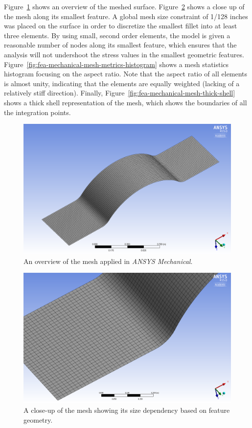 Figure~\ref{fig:fea-mechanical-mesh-surface} shows an overview of the meshed surface. Figure~\ref{fig:fea-mechanical-mesh-closeup} shows a close up of the mesh along its smallest feature. A global mesh size constraint of 1/128 inches was placed on the surface in order to discretize the smallest fillet into at least three elements. By using small, second order elements, the model is given a reasonable number of nodes along its smallest feature, which ensures that the analysis will not undershoot the stress values in the smallest geometric features. Figure~\ref{fig:fea-mechanical-mesh-metrics-histogram} shows a mesh statistics histogram focusing on the aspect ratio. Note that the aspect ratio of all elements is almost unity, indicating that the elements are equally weighted (lacking of a relatively stiff direction). Finally, Figure~\ref{fig:fea-mechanical-mesh-thick-shell} shows a thick shell representation of the mesh, which shows the boundaries of all the integration points.\\


\begin{figure}[htp]
\centering
\includegraphics[width=1\textwidth]{./figures/fea/fea-mechanical-mesh-surface}
\caption{An overview of the mesh applied in \textit{ANSYS Mechanical}.}
\label{fig:fea-mechanical-mesh-surface}
\end{figure}

\begin{figure}[htp]
\centering
\includegraphics[width=1\textwidth]{./figures/fea/fea-mechanical-mesh-closeup}
\caption{A close-up of the mesh showing its size dependency based on feature geometry.}
\label{fig:fea-mechanical-mesh-closeup}
\end{figure}

